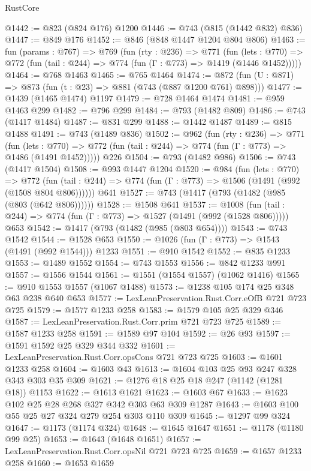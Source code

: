 \begin{lexlean}{RustCore}
\begin{coremodule}
@1442 := @823 (@824 @176) @1200
@1446 := @743 (@815 (@1442 @832) @836)
@1447 := @849 @176
@1452 := @846 (@848 @1447 @1204 @804 @806)
@1463 := fun (params : @767) =>
  @769
    (fun (rty : @236) =>
    @771
      (fun (lets : @770) =>
      @772 (fun (tail : @244) => @774 (fun (Γ : @773) => @1419 (@1446 @1452)))))
@1464 := @768 @1463
@1465 := @765 @1464
@1474 := @872 (fun (U : @871) => @873 (fun (t : @23) => @881 (@743 (@887 @1200 @761) @898)))
@1477 := @1439 (@1465 @1474) @1197
@1479 := @728 @1464 @1474
@1481 := @959 @1463 @299
@1482 := @796 @299
@1484 := @793 (@1482 @809)
@1486 := @743 (@1417 @1484)
@1487 := @831 @299
@1488 := @1442 @1487
@1489 := @815 @1488
@1491 := @743 (@1489 @836)
@1502 := @962
    (fun (rty : @236) =>
    @771
      (fun (lets : @770) =>
      @772 (fun (tail : @244) => @774 (fun (Γ : @773) => @1486 (@1491 @1452)))))
    @226
@1504 := @793 (@1482 @986)
@1506 := @743 (@1417 @1504)
@1508 := @993 @1447 @1204
@1520 := @984
    (fun (lets : @770) =>
    @772 (fun (tail : @244) => @774 (fun (Γ : @773) => @1506 (@1491 (@992 (@1508 @804 @806))))))
    @641
@1527 := @743 (@1417 (@793 (@1482 (@985 (@803 (@642 @806))))))
@1528 := @1508 @641
@1537 := @1008
    (fun (tail : @244) => @774 (fun (Γ : @773) => @1527 (@1491 (@992 (@1528 @806)))))
    @653
@1542 := @1417 (@793 (@1482 (@985 (@803 @654))))
@1543 := @743 @1542
@1544 := @1528 @653
@1550 := @1026 (fun (Γ : @773) => @1543 (@1491 (@992 @1544))) @1233
@1551 := @910 @1542
@1552 := @835 @1233
@1553 := @1489 @1552
@1554 := @743 @1553
@1556 := @842 @1233 @991
@1557 := @1556 @1544
@1561 := @1551 (@1554 @1557) (@1062 @1416)
@1565 := @910 @1553 @1557 (@1067 @1488)
@1573 := @1238 @105 @174 @25 @348 @63 @238 @640 @653
@1577 := LexLeanPreservation.Rust.Corr.eOfB @721 @723 @725
@1579 := @1577 @1233 @258
@1583 := @1579 @105 @25 @329 @346
@1587 := LexLeanPreservation.Rust.Corr.prim @721 @723 @725
@1589 := @1587 @1233 @258
@1591 := @1589 @97 @104
@1592 := @26 @93
@1597 := @1591 @1592 @25 @329 @344 @332
@1601 := LexLeanPreservation.Rust.Corr.opsCons @721 @723 @725
@1603 := @1601 @1233 @258
@1604 := @1603 @43
@1613 := @1604 @103 @25 @93 @247 @328 @343 @303 @35 @309
@1621 := @1276 @18 @25 @18 @247 (@1142 (@1281 @18)) @1153
@1622 := @1613 @1621
@1623 := @1603 @67
@1633 := @1623 @102 @25 @28 @268 @327 @342 @303 @63 @309 @1287
@1643 := @1603 @100 @55 @25 @27 @324 @279 @254 @303 @110 @309
@1645 := @1297 @99 @324
@1647 := @1173 (@1174 @324)
@1648 := @1645 @1647
@1651 := @1178 (@1180 @99 @25)
@1653 := @1643 (@1648 @1651)
@1657 := LexLeanPreservation.Rust.Corr.opsNil @721 @723 @725
@1659 := @1657 @1233 @258
@1660 := @1653 @1659

\end{coremodule}
\end{lexlean}
